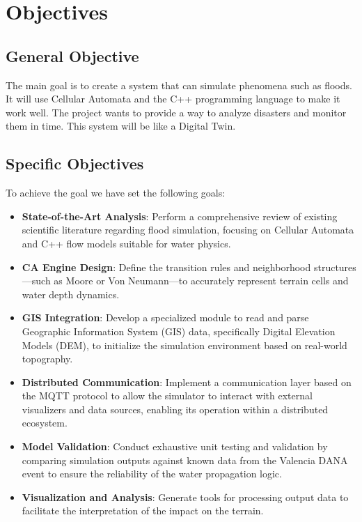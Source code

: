 \section{Objectives}

\subsection{General Objective}

The main goal is to create a system that can simulate phenomena such as floods. It will use Cellular Automata and the C++ programming 
language to make it work well. The project wants to provide a way to analyze disasters and monitor them in time. This system will be 
like a Digital Twin.

\subsection{Specific Objectives}

To achieve the goal we have set the following goals:

\begin{itemize}
\item \textbf{State-of-the-Art Analysis}: Perform a comprehensive review of existing scientific literature regarding flood simulation, focusing on Cellular Automata and C++ flow models suitable for water physics.
\item \textbf{CA Engine Design}: Define the transition rules and neighborhood structures—such as Moore or Von Neumann—to accurately represent terrain cells and water depth dynamics.
\item \textbf{GIS Integration}: Develop a specialized module to read and parse Geographic Information System (GIS) data, specifically Digital Elevation Models (DEM), to initialize the simulation environment based on real-world topography.
\item \textbf{Distributed Communication}: Implement a communication layer based on the MQTT protocol to allow the simulator to interact with external visualizers and data sources, enabling its operation within a distributed ecosystem.
\item \textbf{Model Validation}: Conduct exhaustive unit testing and validation by comparing simulation outputs against known data from the Valencia DANA event to ensure the reliability of the water propagation logic.
\item \textbf{Visualization and Analysis}: Generate tools for processing output data to facilitate the interpretation of the impact on the terrain.
\end{itemize}


